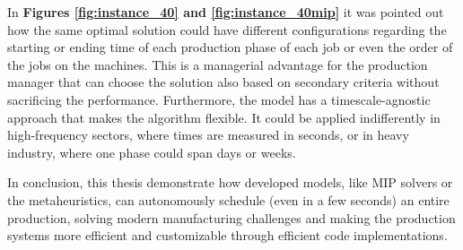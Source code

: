 In \textbf{Figures \ref{fig:instance_40} and \ref{fig:instance_40mip}} it was pointed out how the same optimal solution could have different configurations regarding the starting or ending time of each production phase of each job or even the order of the jobs on the machines. This is a managerial advantage for the production manager that can choose the solution also based on secondary criteria without sacrificing the performance. Furthermore, the model has a timescale-agnostic approach that makes the algorithm flexible. It could be applied indifferently in high-frequency sectors, where times are measured in seconds, or in heavy industry, where one phase could span days or weeks.

In conclusion, this thesis demonstrate how developed models, like MIP solvers or the metaheuristics, can autonomously schedule (even in a few seconds) an entire production, solving modern manufacturing challenges and making the production systems more efficient and customizable through efficient code implementations. 